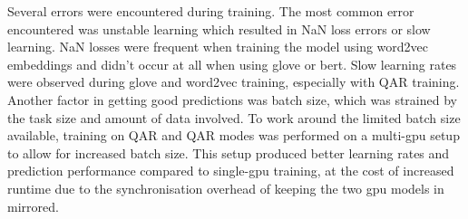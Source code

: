 Several errors were encountered during training.
The most common error encountered was unstable learning which resulted in NaN loss errors or slow learning.
NaN losses were frequent when training the model using word2vec embeddings and didn't occur at all when using glove or bert.
Slow learning rates were observed during glove and word2vec training, especially with Q\rightarrow{}AR training.
Another factor in getting good predictions was batch size, which was strained by the task size and amount of data involved.
To work around the limited batch size available, training on QA\rightarrow{}R and Q\rightarrow{}AR modes was performed on a multi-gpu setup to allow for increased batch size.
This setup produced better learning rates and prediction performance compared to single-gpu training, at the cost of increased runtime due to the synchronisation overhead of keeping the two gpu models in mirrored.
